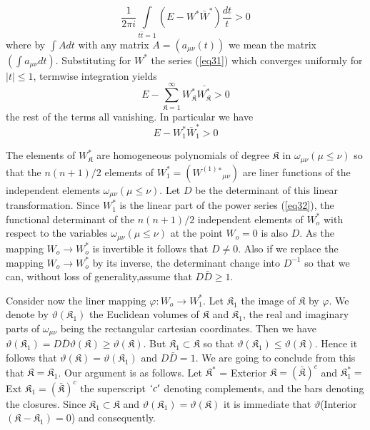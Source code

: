 \begin{equation*}
\frac{1}{2 \pi i} \int\limits_{t \bar{t} =1} (E -W^* \bar{W}^*) \frac{dt}{t}
> 0 \tag{33}\label{eq33}   
\end{equation*}
where by $\int A dt$ with any matrix $ A = (a_{\mu \nu} (t))$ we mean
the matrix\break $(\int a_{\mu \nu} dt)$. Substituting for $W^*$ the series
(\ref{eq31}) which converges uniformly for $| t | \le 1$, termwise
integration yields  
\begin{equation*}
E -\sum_{\mathfrak{K} = 1}^\infty W^*_\mathfrak{K}
\bar{W^*_\mathfrak{K}} > 0 \tag{34}\label{eq34}   
\end{equation*}
the rest of the terms all vanishing. In particular we have
\begin{equation*}
E -W^*_1 \bar{W}^*_1 > 0 \tag{35}\label{eq35}  
\end{equation*}

The elements of $W^*_{\mathfrak{K}}$ are homogeneous polynomials of
degree $\mathfrak{K}$ in $\omega _{\mu \nu} (\mu \le \nu)$ so that the
$n (n+1) /2$ elements of $W^*_1 = (W^{(1)}{^*}_{\mu \nu})$ are
liner functions of the independent elements $\omega_{\mu \nu} (\mu \le
\nu)$. Let $D$ be the determinant of this linear transformation. Since
$W^*_1$ is the linear part of the power series (\ref{eq32}), the functional
determinant of the $n(n+1)/2$ independent elements of $W^*_o$ with
respect to the variables $\omega_{\mu \nu} (\mu \le \nu)$ at the point
$W_o = 0$ is also $D$. As the mapping $W_o \to W^*_o$ is invertible it
follows that $D \neq 0$. Also if we replace the mapping $W_o \to W_o^*$
by its inverse, the determinant change into $D^{-1}$ so that we can,
without loss of generality,assume that $D \bar{D} \ge 1$.   

Consider now the liner mapping $\varphi : W_o \to W^*_1$. Let
$\mathfrak{K}_1$ the image of $\mathfrak{K}$ by $\varphi$. We denote
by $\vartheta(\mathfrak{K}_1)$ the Euclidean volumes of $\mathfrak{K}$
and $\mathfrak{K}_1$, the real and imaginary parts of
$\omega_{\mu \nu}$ being the rectangular cartesian coordinates. Then
we have $\vartheta(\mathfrak{K}_1) = D \bar{D} \vartheta
(\mathfrak{K}) \ge \vartheta (\mathfrak{K})$.  But $\mathfrak{K}_1
\subset \mathfrak{K}$ so that $\vartheta(\mathfrak{K}_1) \le \vartheta
(\mathfrak{K})$. Hence it follows that\pageoriginale
$\vartheta(\mathfrak{K}) = 
\vartheta (\mathfrak{K}_1)$ and $D \bar{D} = 1$. We are going
to conclude from this that $\mathfrak{K} = \mathfrak{K}_1$. Our
argument is as follows. Let $ \mathfrak{K}^\ast$ = Exterior
$\mathfrak{K}= (\bar{\mathfrak{K}})^c$ and $\mathfrak{K}^*_1 =$
Ext  $\mathfrak{K}_1 = (\bar{\mathfrak{K}})^c$  the superscript $`c'$
denoting complements, and the bars denoting the closures. Since
$\mathfrak{K}_1 \subset \mathfrak{K}$ and $\vartheta (\mathfrak{K}_1)
= \vartheta (\mathfrak{K})$ it is immediate that $\vartheta$(Interior
$(\mathfrak{K} - \mathfrak{K}_1) = 0$) and consequently. 


